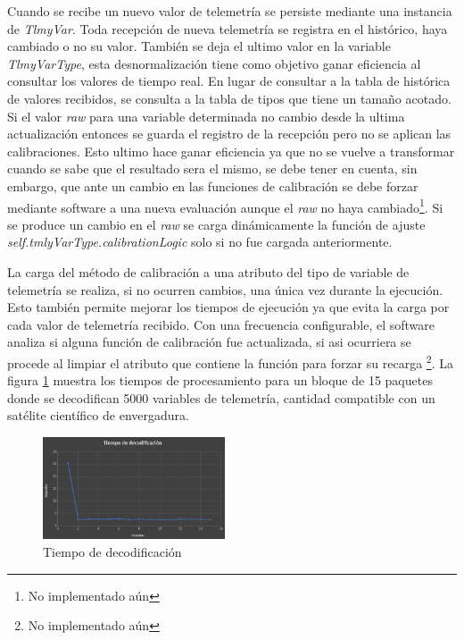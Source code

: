 \documentclass[twoside,twocolumn]{article}
\begin{document}
Cuando se recibe un nuevo valor de telemetría se persiste mediante una instancia de \textit{TlmyVar}. Toda recepción de nueva telemetría se registra en el histórico, haya cambiado o no su valor. También se deja el ultimo valor en la variable \textit{TlmyVarType}, esta desnormalización tiene como objetivo ganar eficiencia al consultar los valores de tiempo real. En lugar de consultar a la tabla de histórica de valores recibidos, se consulta a la tabla de tipos que tiene un tamaño acotado. Si el valor \textit{raw} para una variable determinada no cambio desde la ultima actualización entonces se guarda el registro de la recepción pero no se aplican las calibraciones. Esto ultimo hace ganar eficiencia ya que no se vuelve a transformar cuando se sabe que el resultado sera el mismo, se debe tener en cuenta, sin embargo, que ante un cambio en las funciones de calibración se debe forzar mediante software a una nueva evaluación aunque el \textit{raw} no haya cambiado\footnote{No implementado aún}.  
Si se produce un cambio en el \textit{raw} se carga dinámicamente la función de ajuste \textit{self.tmlyVarType.calibrationLogic} solo si no fue cargada anteriormente. 


La carga del método de calibración a una atributo del tipo de variable de telemetría se realiza, si no ocurren cambios, una única vez durante la ejecución. Esto también permite mejorar los tiempos de ejecución ya que evita la carga por cada valor de telemetría recibido. Con una frecuencia configurable, el software analiza si alguna función de calibración fue actualizada, si asi ocurriera se procede al limpiar el atributo que contiene la función para forzar su recarga \footnote{No implementado aún}. La figura \ref{fig:TiempoDecodificacion} muestra los tiempos de procesamiento para un bloque de 15 paquetes donde se decodifican 5000 variables de telemetría, cantidad compatible con un satélite científico de envergadura.

\begin{figure}[]
  \caption{Tiempo de decodificación}
  \label{fig:TiempoDecodificacion}
  \centering
  \includegraphics[width=0.48\textwidth]{Imagenes/tiempoDecodificacion2.png}
\end{figure}
\end{document}

